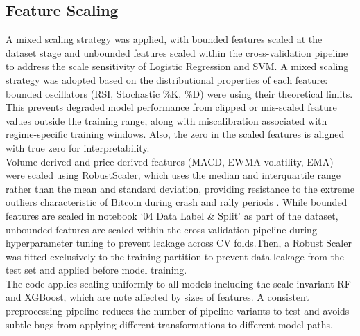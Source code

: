 \subsection{Feature Scaling}
A mixed scaling strategy was applied, with bounded features scaled at the dataset stage and unbounded features scaled within the cross-validation pipeline to address the scale sensitivity of Logistic Regression and SVM. A mixed scaling strategy was adopted based on the distributional properties of each feature: bounded oscillators (RSI, Stochastic \%K, \%D) were using their theoretical limits. This prevents degraded model performance from clipped or mis-scaled feature values outside the training range, along with miscalibration associated with regime-specific training windows. Also, the zero in the scaled features is aligned with true zero for interpretability.\\
Volume-derived and price-derived features (MACD, EWMA volatility, EMA) were scaled using RobustScaler, which uses the median and interquartile range rather than the mean and standard deviation, providing resistance to the extreme outliers characteristic of Bitcoin during crash and rally periods \cite{RobustScaler}. While bounded features are scaled in notebook ‘04 Data Label \& Split’ as part of the dataset, unbounded features are scaled within the cross-validation pipeline during hyperparameter tuning to prevent leakage across CV folds.Then, a Robust Scaler was fitted exclusively to the training partition to prevent data leakage from the test set and applied before model training.\\
The code applies scaling uniformly to all models including the scale-invariant RF and XGBoost, which are note affected by sizes of features. A consistent preprocessing pipeline reduces the number of pipeline variants to test and avoids subtle bugs from applying different transformations to different model paths.
